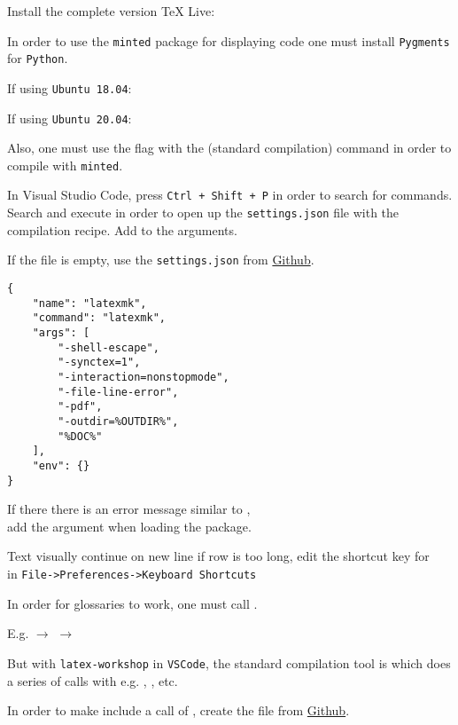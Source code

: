 Install the complete version TeX Live:


In order to use the \texttt{minted} package for displaying code one must install \texttt{Pygments} for \texttt{Python}.

If using \texttt{Ubuntu 18.04}:


If using \texttt{Ubuntu 20.04}:


Also, one must use the  flag with the  (standard compilation) command in order to compile with \texttt{minted}.

In Visual Studio Code, press \texttt{Ctrl + Shift + P} in order to search for commands. Search and execute  in order to open up the \texttt{settings.json} file with the compilation recipe. Add  to the arguments.

If the file is empty, use the \texttt{settings.json} from \href{https://github.com/robinhellmers/computer_setup/blob/master/latex-workshop/settings.json}{Github}.

\begin{verbatim}
{
    "name": "latexmk",
    "command": "latexmk",
    "args": [
        "-shell-escape",
        "-synctex=1",
        "-interaction=nonstopmode",
        "-file-line-error",
        "-pdf",
        "-outdir=%OUTDIR%",
        "%DOC%"
    ],
    "env": {}
}
\end{verbatim}

If there there is an error message similar to ,\\
add the argument  when loading the  package. 



Text visually continue on new line if row is too long, edit the shortcut key for\\ in \texttt{File->Preferences->Keyboard Shortcuts}


In order for glossaries to work, one must call .

E.g.   \(\rightarrow\)  \(\rightarrow\) 

But with \texttt{latex-workshop} in \texttt{VSCode}, the standard compilation tool is  which does a series of calls with e.g. , , etc.

In order to make  include a call of , create the file  from \href{https://github.com/robinhellmers/computer_setup}{Github}.
